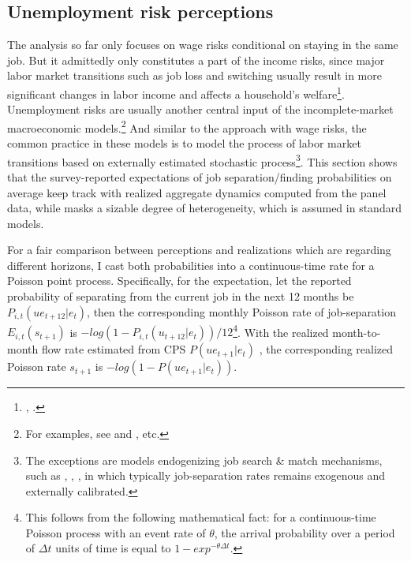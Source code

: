\hypertarget{unemployment-risk-perceptions}{%
\subsection{Unemployment risk perceptions}\label{unemployment-risk-perceptions}}

The analysis so far only focuses on wage risks conditional on staying in the same job. But it admittedly only constitutes a part of the income risks, since major labor market transitions such as job loss and switching usually result in more significant changes in labor income and affects a household's welfare\footnote{\cite{low2010wage}, \cite{davis2011recessions}.}. Unemployment risks are usually another central input of the incomplete-market macroeconomic models.\footnote{For examples, see \cite{krueger2016macroeconomics} and \cite{bayer2019precautionary}, etc.} And similar to the approach with wage risks, the common practice in these models is to model the process of labor market transitions based on externally estimated stochastic process\footnote{The exceptions are models endogenizing job search \& match mechanisms, such as \cite{ravn2017job}, \cite{ravn2021macroeconomic}, \cite{mckay2017time}, in which typically job-separation rates remains exogenous and externally calibrated.}. This section shows that the survey-reported expectations of job separation/finding probabilities on average keep track with realized aggregate dynamics computed from the panel data, while masks a sizable degree of heterogeneity, which is assumed in standard models.  


For a fair comparison between perceptions and realizations which are regarding different horizons, I cast both probabilities into a continuous-time rate for a Poisson point process. Specifically, for the expectation, let the reported probability of separating from the current job in the next 12 months be $P_{i,t}(ue_{t+12}|e_t)$, then the corresponding monthly Poisson rate of job-separation $E_{i,t}(s_{t+1})$ is $- log(1-P_{i,t}(u_{t+12}|e_t))/12$\footnote{This follows from the following mathematical fact: for a continuous-time Poisson process with an event rate of $\theta$, the arrival probability over a period of $\Delta t$ units of time is equal to $1-exp^{-\theta \Delta t}$.}. With the realized month-to-month flow rate estimated from CPS $P(ue_{t+1}|e_t)$ , the corresponding realized Poisson rate  $s_{t+1}$ is $-log(1-P(ue_{t+1}|e_t))$. 


